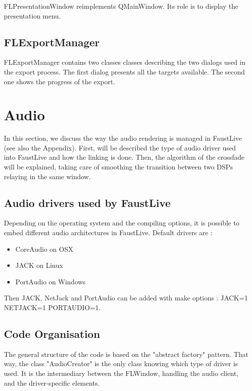 \documentclass[a4paper]{article}
\begin{document}
{FLPresentationWindow reimplements QMainWindow. Its role is to display the presentation menu.

\subsection{FLExportManager}

FLExportManager contains two classes classes describing the two dialogs used in the export process. The first dialog presents all the targets available. The second one shows the progress of the export.

\section{Audio \label{Audio}}

In this section, we discuss the way the audio rendering is managed in FaustLive (see also the Appendix).
First, will be described the type of audio driver used into FaustLive and how the linking is done. Then, the algorithm of the crossfade will be explained, taking care of smoothing the transition between two DSPs relaying in the same window. 

\subsection{Audio drivers used by FaustLive}
 
Depending on the operating system and the compiling options, it is possible to embed different audio architectures in FaustLive.
Default drivers are :
\begin{itemize}
\item CoreAudio on OSX
\item JACK on Linux
\item PortAudio on Windows
\end{itemize}

Then JACK, NetJack and PortAudio can be added with make options : JACK=1 NETJACK=1 PORTAUDIO=1.

\subsection{Code Organisation}

The general structure of the code is based on the "abstract factory" pattern. That way, the class "AudioCreator" is the only class knowing which type of driver is used. It is the intermediary between the FLWindow, handling the audio client, and the driver-specific elements.  \\

}
\end{document}
